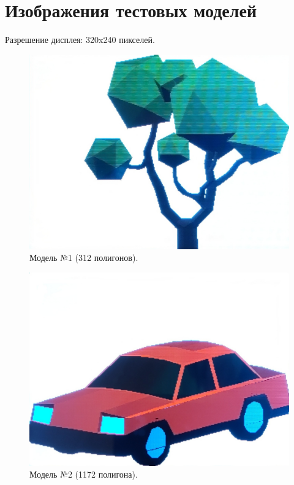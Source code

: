 \chapter{Изображения тестовых моделей}
\label{cha:appendix4}
Разрешение дисплея: 320x240 пикселей.

\begin{figure}[h]
	\centering
	\includegraphics[scale=0.2 ]{img/models/tree.jpg}
	\caption{Модель №1 (312 полигонов).}
	\label{fig:warnock_algorithm}
\end{figure}

\begin{figure}[h]
	\centering
	\includegraphics[scale=0.2 ]{img/models/car.jpg}
	\caption{Модель №2 (1172 полигона).}
	\label{fig:warnock_identification}
\end{figure}

